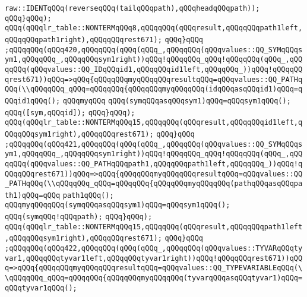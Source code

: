 \verb|raw::IDENTqQQq(reverseqQQq(tailqQQqpath),qQQqheadqQQqpath));|\newline
\verb|qQQq}qQQq);|\newline
\verb|qQQq(qQQqlr_table::NONTERMqQQq8,qQQqqQQq(qQQqresult,qQQqqQQqpath1left,qQQqqQQqpath1right),qQQqqQQqrest671);|\newline
\verb|qQQq}qQQq|\newline
\verb|;qQQqqQQq(qQQq420,qQQqqQQq(qQQq(qQQq_,qQQqqQQq(qQQqvalues::QQ_SYMqQQqsym1,qQQqqQQq_,qQQqqQQqsym1right))qQQq!qQQqqQQq_qQQq!qQQqqQQq(qQQq_,qQQqqQQq(qQQqvalues::QQ_IDqQQqid1,qQQqqQQqid1left,qQQqqQQq_))qQQq!qQQqqQQqrest671))qQQq=>qQQq{qQQqqQQqmyqQQqqQQqresultqQQq=qQQqvalues::QQ_PATHqQQq(\\qQQqqQQq_qQQq=qQQqqQQq{qQQqqQQqmyqQQqqQQq(idqQQqasqQQqid1)qQQq=qQQqid1qQQq();|\newline
\verb|qQQqmyqQQq|\newline
\verb|qQQq(symqQQqasqQQqsym1)qQQq=qQQqsym1qQQq();|\newline
\verb|qQQq([sym,qQQqid]);|\newline
\verb|qQQq}qQQq);|\newline
\verb|qQQq(qQQqlr_table::NONTERMqQQq15,qQQqqQQq(qQQqresult,qQQqqQQqid1left,qQQqqQQqsym1right),qQQqqQQqrest671);|\newline
\verb|qQQq}qQQq|\newline
\verb|;qQQqqQQq(qQQq421,qQQqqQQq(qQQq(qQQq_,qQQqqQQq(qQQqvalues::QQ_SYMqQQqsym1,qQQqqQQq_,qQQqqQQqsym1right))qQQq!qQQqqQQq_qQQq!qQQqqQQq(qQQq_,qQQqqQQq(qQQqvalues::QQ_PATHqQQqpath1,qQQqqQQqpath1left,qQQqqQQq_))qQQq!qQQqqQQqrest671))qQQq=>qQQq{qQQqqQQqmyqQQqqQQqresultqQQq=qQQqvalues::QQ_PATHqQQq(\\qQQqqQQq_qQQq=qQQqqQQq{qQQqqQQqmyqQQqqQQq(pathqQQqasqQQqpath1)qQQq=qQQq|\newline
\verb|path1qQQq();|\newline
\verb|qQQqmyqQQqqQQq(symqQQqasqQQqsym1)qQQq=qQQqsym1qQQq();|\newline
\verb|qQQq(symqQQq!qQQqpath);|\newline
\verb|qQQq}qQQq);|\newline
\verb|qQQq(qQQqlr_table::NONTERMqQQq15,qQQqqQQq(qQQqresult,qQQqqQQqpath1left,qQQqqQQqsym1right),qQQqqQQqrest671);|\newline
\verb|qQQq}qQQq|\newline
\verb|;qQQqqQQq(qQQq422,qQQqqQQq(qQQq(qQQq_,qQQqqQQq(qQQqvalues::TYVARqQQqtyvar1,qQQqqQQqtyvar1left,qQQqqQQqtyvar1right))qQQq!qQQqqQQqrest671))qQQq=>qQQq{qQQqqQQqmyqQQqqQQqresultqQQq=qQQqvalues::QQ_TYPEVARIABLEqQQq(\\qQQqqQQq_qQQq=qQQqqQQq{qQQqqQQqmyqQQqqQQq(tyvarqQQqasqQQqtyvar1)qQQq=qQQqtyvar1qQQq();|\newline
